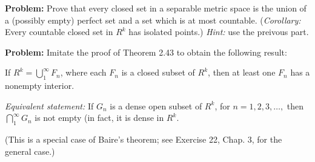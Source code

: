 \documentclass[10pt]{article}
\newenvironment{problem}{\textbf{Problem:}}{}
\begin{document}
	\begin{problem}
		Prove that every closed set in a separable metric space is the union of a (possibly empty) perfect 
		set and a set which is at most countable. (\textit{Corollary:} Every countable closed 
		set in \( R^{k} \) has isolated points.) \textit{Hint:} use the preivous part. 
	\end{problem}

	\begin{problem}
		Imitate the proof of Theorem 2.43 to obtain the following result: 
		\begin{center}
			\begin{minipage}{0.9\textwidth} 
				If \( R^{k} = \bigcup_1^{\infty} F_n \), where each \( F_n \) is a closed subset of \( R^{k} \), 
				then at least one \( F_n \) has a nonempty interior. 

				\textit{Equivalent statement:} If \( G_n \) is a dense open subset of \( R^{k} \), 
				for \( n = 1, 2, 3, \dots,  \) then \( \bigcap_1^{\infty}G_n \) is not empty 
				(in fact, it is dense in \( R^{k} \). 
			\end{minipage}
		\end{center}
		(This is a special case of Baire's theorem; see Exercise 22, Chap. 3, for the general case.)
	\end{problem}
\end{document}
